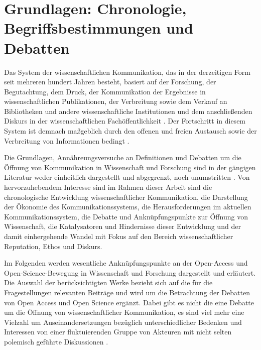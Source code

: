 \chapter{Grundlagen: Chronologie, Begriffsbestimmungen und Debatten}

Das System der wissenschaftlichen Kommunikation, das in der derzeitigen Form seit mehreren hundert Jahren besteht, basiert auf der Forschung, der Begutachtung, dem Druck, der Kommunikation der Ergebnisse in wissenschaftlichen Publikationen, der Verbreitung sowie dem Verkauf an Bibliotheken und andere wissenschaftliche Institutionen \cite{cite:11a} und dem anschließenden Diskurs in der wissenschaftlichen Fachöffentlichkeit \cite{bbaw_publizieren_2015}. Der Fortschritt in diesem System ist demnach maßgeblich durch den offenen und freien Austausch sowie der Verbreitung von Informationen bedingt \cite{cite:11}.

Die Grundlagen, Annähreungsversuche an Definitionen und Debatten um die Öffnung von Kommunikation in Wissenschaft und Forschung sind in der gängigen Literatur weder einheitlich dargestellt und abgegrenzt, noch unumstritten \cite{muller_2010_open} \cite{schulze_2013_open}. Von hervorzuhebendem Interesse sind im Rahmen dieser Arbeit sind die chronologische Entwicklung wissenschaftlicher Kommunikation, die Darstellung der Ökonomie des Kommunikationssystems, die Herausforderungen im aktuellen Kommunikationssystem, die Debatte und Anknüpfungspunkte zur Öffnung von Wissenschaft, die Katalysatoren und Hindernisse dieser Entwicklung und der damit einhergehende Wandel mit Fokus auf den Bereich wissenschaftlicher Reputation, Ethos und Diskurs.

Im Folgenden werden wesentliche Anknüpfungspunkte an der Open-Access und Open-Science-Bewegung in Wissenschaft und Forschung dargestellt und erläutert. Die Auswahl der berücksichtigten Werke bezieht sich auf die für die Fragestellungen relevanten Beiträge und wird um die Betrachtung der Debatten von Open Access und Open Science ergänzt. Dabei gibt es nicht die eine Debatte um die Öffnung von wissenschaftlicher Kommunikation, es sind viel mehr eine Vielzahl um Auseinandersetzungen bezüglich unterschiedlicher Bedenken und Interessen von einer fluktuierenden Gruppe von Akteuren \cite{Beals_2013} mit nicht selten polemisch geführte Diskussionen \cite{Lossau_oa_2007} \cite{naeder_2010_open}.


